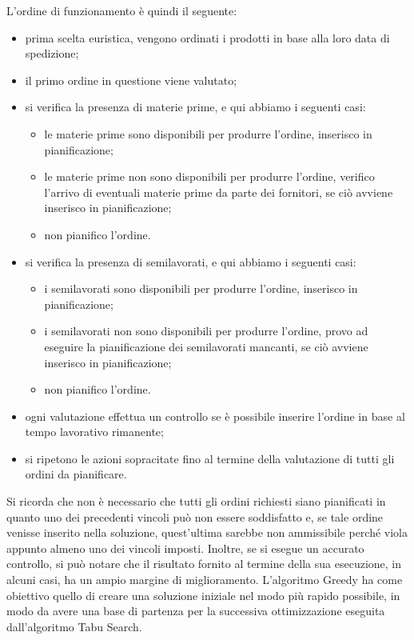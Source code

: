 L'ordine di funzionamento è quindi il seguente:

\begin{itemize}
    \item prima scelta euristica, vengono ordinati i prodotti in base alla loro data di spedizione;
    \item il primo ordine in questione viene valutato;
    \item si verifica la presenza di materie prime, e qui abbiamo i seguenti casi:
            \begin{itemize}
                \item le materie prime sono disponibili per produrre l'ordine, inserisco in pianificazione;
                \item le materie prime non sono disponibili per produrre l'ordine, verifico l'arrivo di eventuali materie prime da parte dei fornitori,
                 se ciò avviene inserisco in pianificazione;
                \item non pianifico l'ordine.
            \end{itemize}
    \item si verifica la presenza di semilavorati, e qui abbiamo i seguenti casi:
            \begin{itemize}
                \item i semilavorati sono disponibili per produrre l'ordine, inserisco in pianificazione;
                \item i semilavorati non sono disponibili per produrre l'ordine, provo ad eseguire la pianificazione dei semilavorati mancanti, se ciò avviene
                inserisco in pianificazione;
                \item non pianifico l'ordine.
            \end{itemize}
    \item ogni valutazione effettua un controllo se è possibile inserire l'ordine in base al tempo lavorativo rimanente;
    \item si ripetono le azioni sopracitate fino al termine della valutazione di tutti gli ordini da pianificare.
\end{itemize}

Si ricorda che non è necessario che tutti gli ordini richiesti siano pianificati in quanto uno dei precedenti vincoli può non essere soddisfatto e, se tale ordine venisse
inserito nella soluzione, quest'ultima sarebbe non ammissibile perché viola appunto almeno uno dei vincoli imposti. Inoltre, se si esegue un accurato controllo, si può notare che 
il risultato fornito al termine della sua esecuzione, in alcuni casi, ha un ampio margine di miglioramento. L'algoritmo Greedy ha come obiettivo quello di creare una
soluzione iniziale nel modo più rapido possibile, in modo da avere una base di partenza per la successiva ottimizzazione eseguita dall'algoritmo Tabu Search.
